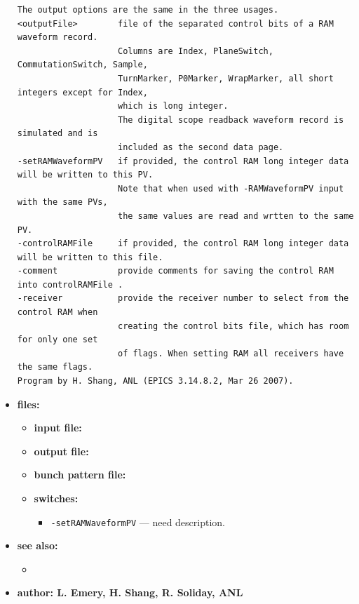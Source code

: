 \begin{itemize}
\begin{verbatim}
The output options are the same in the three usages.
<outputFile>        file of the separated control bits of a RAM waveform record. 
                    Columns are Index, PlaneSwitch, CommutationSwitch, Sample, 
                    TurnMarker, P0Marker, WrapMarker, all short integers except for Index, 
                    which is long integer.
                    The digital scope readback waveform record is simulated and is 
                    included as the second data page. 
-setRAMWaveformPV   if provided, the control RAM long integer data will be written to this PV. 
                    Note that when used with -RAMWaveformPV input with the same PVs, 
                    the same values are read and wrtten to the same PV. 
-controlRAMFile     if provided, the control RAM long integer data will be written to this file. 
-comment            provide comments for saving the control RAM into controlRAMFile .
-receiver           provide the receiver number to select from the control RAM when 
                    creating the control bits file, which has room for only one set 
                    of flags. When setting RAM all receivers have the same flags. 
Program by H. Shang, ANL (EPICS 3.14.8.2, Mar 26 2007).

\end{verbatim}
\normalsize

\item {\bf files:}
\begin{itemize}
\item {\bf input file:} \par

\item {\bf output file:} \par 

\item {\bf bunch pattern file:} \par

%
\item {\bf switches:}
%
%
    \begin{itemize}
%
%
    \item {\tt -setRAMWaveformPV} --- need description.
      
    \end{itemize}
\end{itemize}

\item {\bf see also:}
    \begin{itemize}
%
%
    \item {}
    \end{itemize}
%
%
\item {\bf author: L. Emery, H. Shang, R. Soliday, ANL}
\end{itemize}
